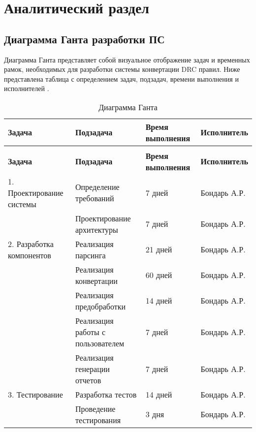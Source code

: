 \chapter{Аналитический раздел}

\section{Диаграмма Ганта разработки ПС}

Диаграмма Ганта представляет собой визуальное отображение задач
и временных рамок, необходимых для разработки системы конвертации DRC правил.
Ниже представлена таблица
с определением задач, подзадач, времени выполнения и исполнителей
.

\begin{longtable}{|p{4.5cm}|p{4cm}|p{3cm}|p{4cm}|}
	\caption{Диаграмма Ганта} \label{table:ganta} \\
	\hline
	\textbf{Задача}
	& \textbf{Подзадача}
	& \textbf{Время выполнения}
	& \textbf{Исполнитель} \\
	\hline
	\endfirsthead
	\conttable{table:ganta} \\
	\hline
	\textbf{Задача}
	& \textbf{Подзадача}
	& \textbf{Время выполнения}
	& \textbf{Исполнитель} \\
	\hline
	\endhead
	1. Проектирование системы
	& Определение требований
	& 7 дней
	& Бондарь А.Р. \\ \hline

	& Проектирование архитектуры
	& 7 дней
	& Бондарь А.Р. \\ \hline

	2. Разработка компонентов
	& Реализация парсинга
	& 21 дней
	& Бондарь А.Р. \\ \hline

	& Реализация конвертации
	& 60 дней
	& Бондарь А.Р. \\ \hline

	& Реализация предобработки
	& 14 дней
	& Бондарь А.Р. \\ \hline

	& Реализация работы с пользователем
	& 7 дней
	& Бондарь А.Р. \\ \hline

	& Реализация генерации отчетов
	& 7 дней
	& Бондарь А.Р. \\ \hline

	3. Тестирование
	& Разработка тестов
	& 14 дней
	& Бондарь А.Р. \\ \hline

	& Проведение тестирования
	& 3 дня
	& Бондарь А.Р. \\ \hline


\end{longtable}
